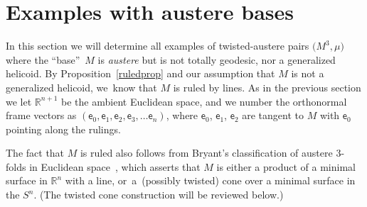 \documentclass[pdftex]{sigma}
\def\R{\mathbb{R}}
\def\ve{\mathsf{e}}
\numberwithin{equation}{section}
\begin{document}
\section{Examples with austere bases} \label{austeresec}

{\sloppy
In this section we will determine all examples of twisted-austere pairs $\big(M^3, \mu\big)$ where the ``base''~$M$ is \emph{austere} but is not totally geodesic, nor a generalized helicoid. By Proposition~\ref{ruledprop} and our assumption that $M$ is not a generalized helicoid, we~know that $M$ is ruled by lines. As in the previous section we let $\R^{n+1}$ be the ambient Euclidean space, and we number the orthonormal frame vectors as $(\ve_0, \ve_1, \ve_2, \ve_3, \dots \ve_n)$, where $\ve_0$, $\ve_1$, $\ve_2$ are tangent to $M$ with $\ve_0$ pointing along the rulings.

}

The fact that $M$ is ruled also follows from Bryant's classification of austere 3-folds in Euclidean space~\cite{Br}, which asserts that $M$ is either a product of a minimal surface in $\R^n$ with a line, or~a~(possibly twisted) cone over a minimal surface in the $S^n$. (The twisted cone construction will be reviewed below.)
\end{document}
